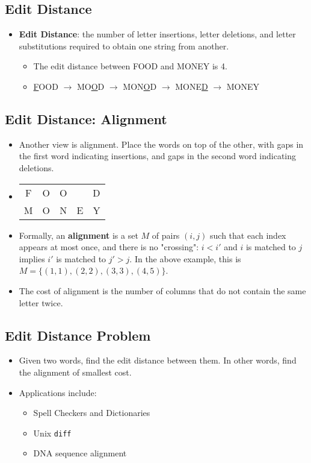 \subsection{Edit Distance}
\begin{itemize}
    \item \textbf{Edit Distance}: the number of letter insertions, letter deletions, and letter substitutions required to obtain one string from another.
    \begin{itemize}
        \item The edit distance between FOOD and MONEY is 4.
        \item \underline{F}OOD $\rightarrow$ MO\underline{O}D $\rightarrow$ MON\underline{O}D $\rightarrow$ MONE\underline{D} $\rightarrow$ MONEY
    \end{itemize}
\end{itemize}

\subsection{Edit Distance: Alignment}
\begin{itemize}
    \item Another view is alignment. Place the words on top of the other, with gaps in the first word indicating insertions, and gaps in the second word indicating deletions.
    \item[] 
        \begin{center}
            \begin{tabular}{c c c c c}
                F & O & O &  & D \\
                M & O & N & E & Y \\
            \end{tabular}
        \end{center}
    \item Formally, an \textbf{alignment} is a set $M$ of pairs $(i, j)$ such that each index appears at most once, and there is no "crossing": $i < i'$ and $i$ is matched to $j$ implies $i'$ is matched to $j' > j$. In the above example, this is $M = \{ (1, 1), (2, 2), (3, 3), (4, 5) \}$.
    \item The cost of alignment is the number of columns that do not contain the same letter twice.
\end{itemize}

\subsection{Edit Distance Problem}
\begin{itemize}
    \item Given two words, find the edit distance between them. In other words, find the alignment of smallest cost.
    \item Applications include:
    \begin{itemize}
        \item Spell Checkers and Dictionaries
        \item Unix \texttt{diff}
        \item DNA sequence alignment
    \end{itemize}
\end{itemize}

